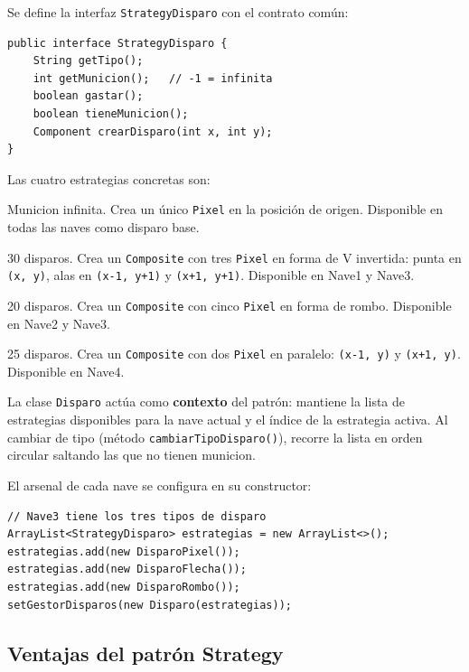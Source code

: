 \documentclass[12pt, a4paper]{article}
\begin{document}
\begin{cajafinal}
Se define la interfaz \texttt{StrategyDisparo} con el contrato com\'{u}n:
\begin{lstlisting}
public interface StrategyDisparo {
    String getTipo();
    int getMunicion();   // -1 = infinita
    boolean gastar();
    boolean tieneMunicion();
    Component crearDisparo(int x, int y);
}
\end{lstlisting}
 
Las cuatro estrategias concretas son:
 
\begin{description}[leftmargin=2em, style=nextline]
    \item[\textbf{DisparoPixel}] Municion infinita. Crea un \'{u}nico \texttt{Pixel} en la posici\'{o}n de origen. Disponible en todas las naves como disparo base.
    \item[\textbf{DisparoFlecha}] 30 disparos. Crea un \texttt{Composite} con tres \texttt{Pixel} en forma de V invertida: punta en \texttt{(x, y)}, alas en \texttt{(x-1, y+1)} y \texttt{(x+1, y+1)}. Disponible en Nave1 y Nave3.
    \item[\textbf{DisparoRombo}] 20 disparos. Crea un \texttt{Composite} con cinco \texttt{Pixel} en forma de rombo. Disponible en Nave2 y Nave3.
    \item[\textbf{DisparoDoble}] 25 disparos. Crea un \texttt{Composite} con dos \texttt{Pixel} en paralelo: \texttt{(x-1, y)} y \texttt{(x+1, y)}. Disponible en Nave4.
\end{description}
 
La clase \texttt{Disparo} act\'{u}a como \textbf{contexto} del patr\'{o}n: mantiene la lista de estrategias disponibles para la nave actual y el \'{i}ndice de la estrategia activa. Al cambiar de tipo (m\'{e}todo \texttt{cambiarTipoDisparo()}), recorre la lista en orden circular saltando las que no tienen municion.
 
El arsenal de cada nave se configura en su constructor:
\begin{lstlisting}
// Nave3 tiene los tres tipos de disparo
ArrayList<StrategyDisparo> estrategias = new ArrayList<>();
estrategias.add(new DisparoPixel());
estrategias.add(new DisparoFlecha());
estrategias.add(new DisparoRombo());
setGestorDisparos(new Disparo(estrategias));
\end{lstlisting}
\end{cajafinal}
 
\subsection{Ventajas del patr\'{o}n Strategy}
 
\end{document}
